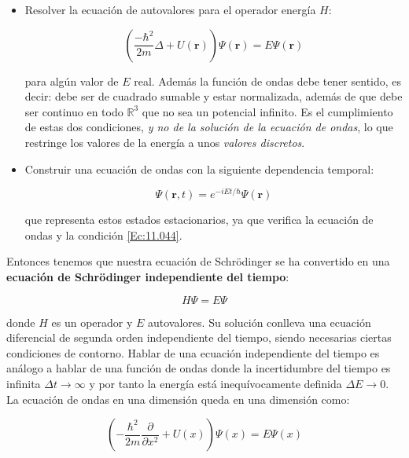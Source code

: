 \documentclass[12pt,a4paper]{article}
\numberwithin{equation}{section}
\numberwithin{figure}{section}
\newcommand{\parentesis}[1]{\left( #1  \right)}
\newcommand{\parciales}[2]{\frac{\partial #1}{\partial #2}}
\newcommand{\rn}{\mathbf{r}}
\begin{document}
\begin{itemize}
\item Resolver la ecuación de autovalores para el operador energía $H$:

\begin{equation}
\parentesis{\dfrac{-\hbar^2}{2m} \Delta + U(\rn)} \Psi (\rn) = E \Psi (\rn)
\end{equation}

para algún valor de $E$ real. Además la función de ondas debe tener sentido, es decir: debe ser de cuadrado sumable y estar normalizada, además de que debe ser continuo en todo $\mathbb{R}^3$ que no sea un potencial infinito. Es el cumplimiento de estas dos condiciones, \textit{y no de la solución de la ecuación de ondas}, lo que restringe los valores de la energía a unos \textit{valores discretos}.

\item Construir una ecuación de ondas con la siguiente dependencia temporal:

\begin{equation}
\Psi (\rn,t) = e^{-i E t/\hbar} \Psi (\rn)
\end{equation}

que representa estos estados estacionarios, ya que verifica la ecuación de ondas y la condición \ref{Ec:11.044}. 

\end{itemize}

Entonces tenemos que nuestra ecuación de Schrödinger se ha convertido en una \textbf{ecuación de Schrödinger independiente del tiempo}:

\begin{equation}
H \Psi = E \Psi
\end{equation}

donde $H$ es un operador y $E$ autovalores. Su solución conlleva una ecuación diferencial de segunda orden independiente del tiempo, siendo necesarias ciertas condiciones de contorno. Hablar de una ecuación independiente del tiempo es análogo a hablar de una función de ondas donde la incertidumbre del tiempo es infinita $\Delta t \rightarrow \infty$ y por tanto la energía está inequívocamente definida $\Delta E \rightarrow 0$. La ecuación de ondas en una dimensión queda en una dimensión como:

\begin{equation}
\parentesis{- \dfrac{\hbar^2}{2m} \parciales{}{x^2} + U(x)} \Psi (x) = E \Psi (x) 
\end{equation}
\end{document}
